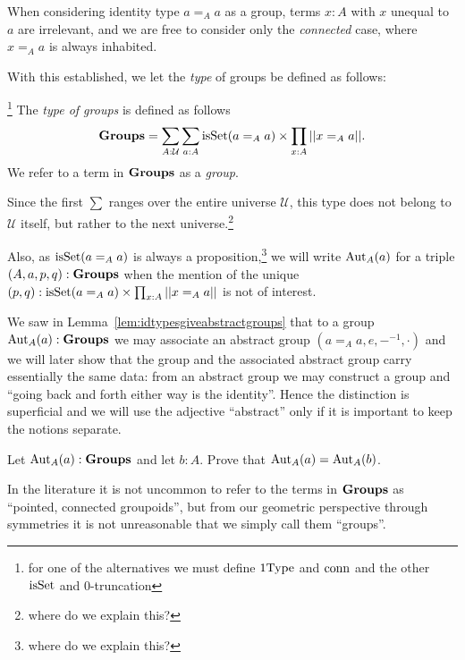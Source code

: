 \begin{remark}
  When considering identity type $a=_Aa$ as a group, terms $x:A$ with $x$ unequal to $a$ are irrelevant, and we are free to consider only the {\em connected} case, \ie where $x=_Aa$ is always inhabited.
\end{remark}



With this established, we let the {\em type} of groups be defined as follows:

\begin{definition}\footnote{for one of the alternatives we must define $\mathrm{1Type}$ and $\mathrm{conn}$ and the other  $\mathrm{isSet}$ and $0$-truncation}
  The {\em type of groups} is defined as follows
$$\mathbf{Groups}=\sum_{A:\mathcal U}\sum_{a:A}\mathrm{isSet}(a=_Aa)\times\prod_{x:A}||x=_Aa||.$$
We refer to a term in $\mathbf{Groups}$ as a {\em group}.
\end{definition}
\begin{remark}
  Since the first $\sum$ ranges over the entire universe $\mathcal U$, this type does not belong to $\mathcal U$ itself, but rather to the next universe.\footnote{where do we explain this?}  

Also, as $\mathrm{isSet}(a=_Aa)$ is always a proposition,\footnote{where do we explain this?}   we will write $\mathrm{Aut}_A(a)$ for a triple $(A,a,p,q):\mathbf{Groups}$ when the mention of the unique $(p,q):\mathrm{isSet}(a=_Aa)\times\prod_{x:A}||x=_Aa||$ is not of interest.

We saw in Lemma~\ref{lem:idtypesgiveabstractgroups} that to a group $\mathrm{Aut}_A(a):\mathbf{Groups}$ we may associate an abstract group $(a=_Aa,e,{-}^{-1},\cdot)$ and we will later show that the group and the associated abstract group carry essentially the same data: from an abstract group we may construct a group and ``going back and forth either way is the identity''.
Hence the distinction is superficial and we will use the adjective ``abstract'' only if it is important to keep the notions separate.
\end{remark}

\begin{xca}
   Let $\mathrm{Aut}_A(a):\mathbf{Groups}$ and let $b:A$.  Prove that $\mathrm{Aut}_A(a)=\mathrm{Aut}_A(b)$.
\end{xca}


\begin{remark}
  In the literature it is not uncommon to refer to the terms in $\mathbf{Groups}$ as ``pointed, connected groupoids'', but from our geometric perspective through symmetries it is not unreasonable that we simply call them ``groups''.
\end{remark}

